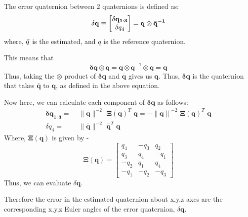 \documentclass[../../main.tex]{subfiles}
\begin{document}
{{The error quaternion between 2 quaternions is defined as:
\begin{equation}
    \delta \mathbf{q} \equiv \begin{bmatrix} \mathbf{\delta q_{1:3}} \\ \delta  q_4 \end{bmatrix} = \mathbf{q \otimes \Bar{q}^{-1}}
\end{equation}
where, $\Bar{q}$ is the estimated, and $q$ is the reference quaternion. 

This means that
\begin{equation}
\label{eqn:2}
    \mathbf{\delta q \otimes \bar{q} = q \otimes \bar{q}^{-1} \otimes \bar{q} = q}
\end{equation}
Thus, taking the $\otimes$ product of $\mathbf{\delta q}$ and $\mathbf{\bar{q}}$ gives us $\mathbf{q}$. Thus, $\mathbf{\delta q}$ is the quaternion that takes $\mathbf{\bar{q}}$ to $\mathbf{q}$, as defined in the above equation.

Now here, we can calculate each component of $\mathbf{\delta q}$ as follows:
\begin{align}
     \mathbf{\delta q_{1:3}} = & \,\, \| \mathbf{\bar{q}} \|^{-2} \,\, \mathbf{\Xi(\bar{q})}^T \,\, \mathbf{q = - \| \bar{q} \|}^{-2} \,\, \mathbf{\Xi(q)}^T \,\, \mathbf{\bar{q}} \\ 
     \delta q_4 = & \,\, \| \mathbf{\bar{q}} \|^{-2} \,\, \mathbf{\bar{q}}^T \,\, \mathbf{q}
\end{align}
Where, $\mathbf{\Xi}(\mathbf{q})$ is given by -
\begin{equation}
    \mathbf{\Xi}(\mathbf{q}) = \begin{bmatrix} q_4 & -q_3 & q_2 \\ q_3 & q_4 & -q_1 \\ -q_2 & q_1 & q_4 \\ -q_1 & -q_2 & -q_3 \end{bmatrix}
\end{equation}
Thus, we can evaluate $\delta \mathbf{q}$. 

Therefore the error in the estimated quaternion about x,y,z axes are the corresponding x,y,z Euler angles of the error quaternion, $\delta \mathbf{q}$.

}


}
\end{document}
